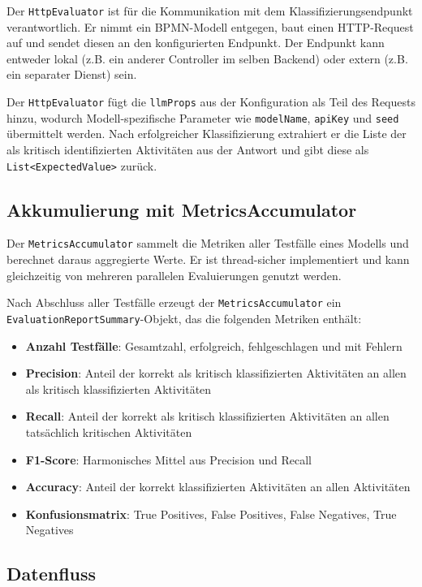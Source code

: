 Der \texttt{HttpEvaluator} ist für die Kommunikation mit dem Klassifizierungsendpunkt verantwortlich. Er nimmt ein \ac{BPMN}-Modell entgegen, baut einen HTTP-Request auf und sendet diesen an den konfigurierten Endpunkt. Der Endpunkt kann entweder lokal (z.B. ein anderer Controller im selben Backend) oder extern (z.B. ein separater Dienst) sein.

Der \texttt{HttpEvaluator} fügt die \texttt{llmProps} aus der Konfiguration als Teil des Requests hinzu, wodurch Modell-spezifische Parameter wie \texttt{modelName}, \texttt{apiKey} und \texttt{seed} übermittelt werden. Nach erfolgreicher Klassifizierung extrahiert er die Liste der als kritisch identifizierten Aktivitäten aus der Antwort und gibt diese als \texttt{List<ExpectedValue>} zurück.

\subsection*{Akkumulierung mit MetricsAccumulator}

Der \texttt{MetricsAccumulator} sammelt die Metriken aller Testfälle eines Modells und berechnet daraus aggregierte Werte. Er ist thread-sicher implementiert und kann gleichzeitig von mehreren parallelen Evaluierungen genutzt werden.

Nach Abschluss aller Testfälle erzeugt der \texttt{MetricsAccumulator} ein \texttt{EvaluationReportSummary}-Objekt, das die folgenden Metriken enthält:

\begin{itemize}
    \item \textbf{Anzahl Testfälle}: Gesamtzahl, erfolgreich, fehlgeschlagen und mit Fehlern
    \item \textbf{Precision}: Anteil der korrekt als kritisch klassifizierten Aktivitäten an allen als kritisch klassifizierten Aktivitäten
    \item \textbf{Recall}: Anteil der korrekt als kritisch klassifizierten Aktivitäten an allen tatsächlich kritischen Aktivitäten
    \item \textbf{F1-Score}: Harmonisches Mittel aus Precision und Recall
    \item \textbf{Accuracy}: Anteil der korrekt klassifizierten Aktivitäten an allen Aktivitäten
    \item \textbf{Konfusionsmatrix}: True Positives, False Positives, False Negatives, True Negatives
\end{itemize}

\subsection*{Datenfluss}

